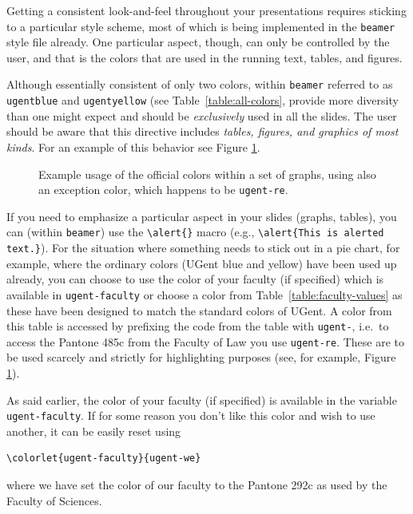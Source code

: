 \documentclass[a4paper,10pt]{article}
\theoremstyle{definition}
\newlength\figurewidth
\newlength\figureheight
\begin{document}
Getting a consistent look-and-feel throughout your presentations requires sticking to a particular style scheme, most of which is being implemented in the \texttt{beamer} style file already. One particular aspect, though, can only be controlled by the user, and that is the colors that are used in the running text, tables, and figures.

Although essentially consistent of only two colors, within \texttt{beamer} referred to as \verb!ugentblue! and \verb!ugentyellow! (see Table~\ref{table:all-colors}, provide more diversity than one might expect and should be \emph{exclusively} used in all the slides. The user should be aware that this directive includes \emph{tables, figures, and graphics of most kinds}. For an example of this behavior see Figure \ref{figure:colored-graphs}.

\setlength\figurewidth{10cm}
\setlength\figureheight{5cm}
\begin{figure}[ht]
  \centering
  
  \caption{Example usage of the official colors within a set of graphs, using also an exception color, which happens to be \texttt{ugent-re}.}
  \label{figure:colored-graphs}
\end{figure}

If you need to emphasize a particular aspect in your slides (graphs, tables), you can (within \texttt{beamer}) use the \verb!\alert{}! macro (e.g., \verb!\alert{This is alerted text.}!). For the situation where something needs to stick out in a pie chart, for example, where the ordinary colors (UGent blue and yellow) have been used up already, you can choose to use the color of your faculty (if specified) which is available in \verb|ugent-faculty| or choose a color from Table~\ref{table:faculty-values} as these have been designed to match the standard colors of UGent. A color from this table is accessed by prefixing the code from the table with \verb|ugent-|, i.e.\ to access the Pantone 485c from the Faculty of Law you use \verb|ugent-re|. These are to be used scarcely and strictly for highlighting purposes (see, for example, Figure \ref{figure:colored-graphs}).

As said earlier, the color of your faculty (if specified) is available in the variable \verb|ugent-faculty|. If for some reason you don't like this color and wish to use another, it can be easily reset using
\begin{verbatim}
\colorlet{ugent-faculty}{ugent-we}
\end{verbatim}
where we have set the color of our faculty to the Pantone 292c as used by the Faculty of Sciences. 
\end{document}
